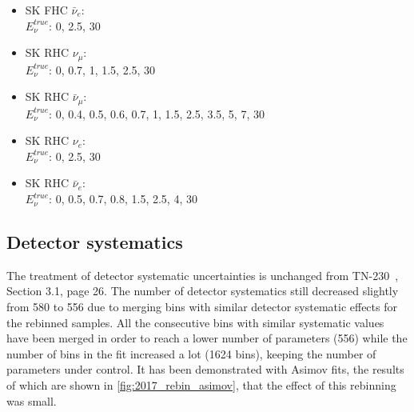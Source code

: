 \begin{itemize}
  \item SK FHC $\bar{\nu}_e$:\\
    $E_\nu^{true}$: 0, 2.5, 30 \\

  \item SK RHC $\nu_\mu$:\\
    $E_\nu^{true}$: 0, 0.7, 1, 1.5, 2.5, 30 \\

  \item SK RHC $\bar{\nu}_\mu$:\\
    $E_\nu^{true}$: 0, 0.4, 0.5, 0.6, 0.7, 1, 1.5, 2.5, 3.5, 5, 7, 30 \\

  \item SK RHC $\nu_e$:\\
    $E_\nu^{true}$: 0, 2.5, 30 \\

  \item SK RHC $\bar{\nu}_e$:\\
    $E_\nu^{true}$: 0, 0.5, 0.7, 0.8, 1.5, 2.5, 4, 30\\
\end{itemize}


\subsection{Detector systematics}
\label{subsec:ND280:syst:flux}
The treatment of detector systematic uncertainties is unchanged from TN-230~\cite{tn_230}, Section 3.1, page 26.
The number of detector systematics still decreased slightly from 580 to 556 due to merging bins with similar detector systematic effects for the rebinned samples.
All the consecutive bins with similar systematic values have been merged in order to reach a lower number of parameters (556) while the number of bins in the fit increased a lot (1624 bins), keeping the number of parameters under control.
It has been demonstrated with Asimov fits, the results of which are shown in \autoref{fig:2017_rebin_asimov}, that the effect of this rebinning was small.

